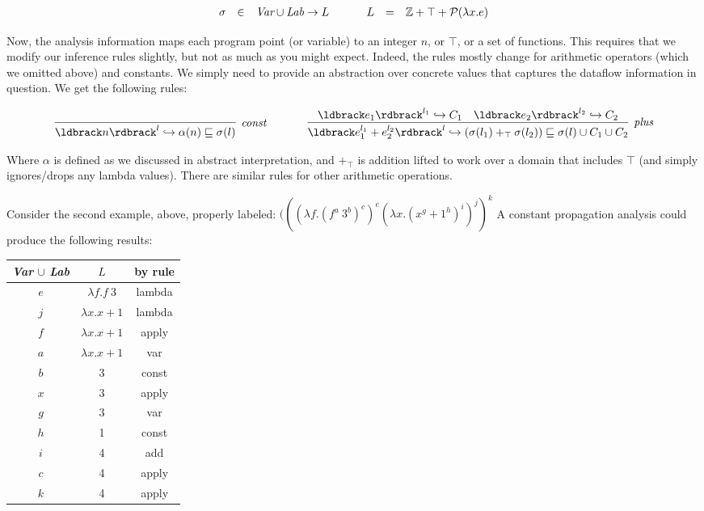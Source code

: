 \documentclass[11pt]{article}
\begin{document}

\[
\begin{array}{lllllll}
\sigma & \in & \textit{Var} \cup \textit{Lab} \rightarrow L & ~~~~ & L & = & \mathbb{Z} + \top + \mathcal{P}(\lambda x . e)
\end{array}
\]

Now, the analysis information maps each program point (or variable) to an
integer $n$, or $\top$, or a set of functions. This requires that we modify our
inference rules slightly, but not as much as you might expect. Indeed, the rules
mostly change for arithmetic operators (which we omitted above) and constants.
We simply need to provide an abstraction over concrete values that captures the
dataflow information in question. We get the following rules:


\[
\begin{array}{ccc}
\infer[\textit{const}]
	{\parg{n}^l \hookrightarrow \alpha(n) \alap \sigma(l)}
	{}
& ~~~~~ &
\infer[\textit{plus}]
	{\parg{e_1^{l_1}+e_2^{l_2}}^l \hookrightarrow (\sigma(l_1) +_\top \sigma(l_2)) \alap \sigma(l) \cup C_1 \cup C_2}
	{\parg{e_1}^{l_1} \hookrightarrow C_1 & \parg{e_2}^{l_2} \hookrightarrow C_2}
    
\end{array}
	\]
	
\noindent Where $\alpha$ is defined as we discussed in abstract interpretation, and $+_\top$ is addition lifted to work over a domain that includes $\top$ (and simply ignores/drops any lambda values).  There are similar rules for other arithmetic operations.

Consider the second example, above, properly labeled: $(((\lambda f . (f^a ~ 3^b)^c)^e (\lambda x . (x^g + 1^h)^i)^j)^k$ A constant propagation analysis could produce the following results:


\tablespace
\begin{tabular}{c | c | c}
\textit{Var} $\cup$ \textit{Lab} & $L$ & by rule \\
\hline
$e$ & $\lambda f . f ~ 3$ & lambda \\
$j$ & $\lambda x . x + 1$ & lambda \\
$f$ & $\lambda x . x + 1$ & apply \\
$a$ & $\lambda x . x + 1$ & var \\
$b$ & 3 & const \\
$x$ & 3 & apply \\
$g$ & 3 & var \\
$h$ & 1 & const \\
$i$ & 4 & add \\
$c$ & 4 & apply \\
$k$ & 4 & apply \\

\end{tabular}
\tablespace
\end{document}

